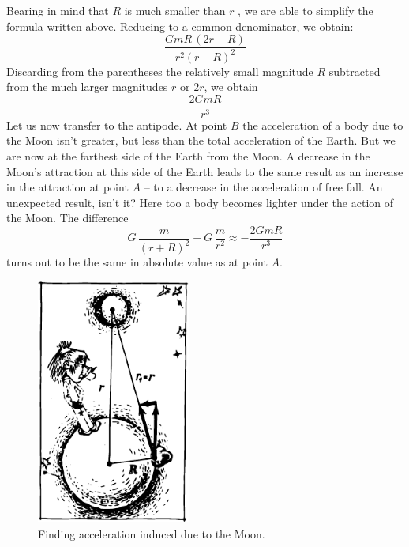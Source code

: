 Bearing in mind that $R$ is much smaller than $r$ , we are able to simplify the formula written above. Reducing
to a common denominator, we obtain:
 \begin{equation*}%
   \dfrac{GmR \, (2r - R)}{r^{2}(r - R)^{2}} 
 \end{equation*}
Discarding from the parentheses the relatively small
magnitude $R$ subtracted from the much larger magnitudes
$r$ or $2r$, we obtain
 \begin{equation*}%
   \dfrac{2GmR}{r^{3}} 
 \end{equation*}
 Let us now transfer to the antipode. At point $B$ the acceleration of a body due to the Moon isn't greater, but less than the total acceleration of the Earth. But we are now at the farthest side of the Earth from the Moon. A decrease in the Moon's attraction at this side of the Earth leads to the same result as an increase in the attraction at point $A$ -- to a decrease in the acceleration of free
fall. An unexpected result, isn't it? Here too a body becomes lighter under the action of the Moon. The difference
 \begin{equation*}%
G \,  \dfrac{m}{(r+ R)^{2}}  - G \, \dfrac{m}{r^{2}} \approx - \dfrac{2GmR}{r^{3}}
 \end{equation*}
turns out to be the same in absolute value as at point $A$.
\begin{figure}[!ht]
\centering
\includegraphics[width=0.45\textwidth]{figures/fig-6-12.pdf}
\caption{Finding acceleration induced due to the Moon.}
\label{fig-6-12}
\end{figure}

